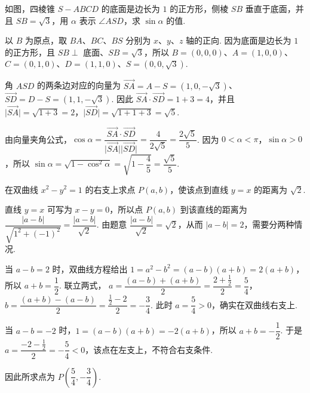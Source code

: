 \begin{problem}
如图，四棱锥 \(S - ABCD\) 的底面是边长为 \(1\) 的正方形，侧棱 \(SB\) 垂直于底面，并且 \(SB = \sqrt{3}\)，用 \(\alpha\) 表示 \(\angle ASD\)，求 \(\sin\alpha\) 的值.

\end{problem}

\begin{solution}
以 \(B\) 为原点，取 \(BA\)、\(BC\)、\(BS\) 分别为 \(x\)、\(y\)、\(z\) 轴的正向. 因为底面是边长为 \(1\) 的正方形，且 \(SB\perp\) 底面、\(SB=\sqrt3\)，所以
\(B=(0,0,0)\)、\(A=(1,0,0)\)、\(C=(0,1,0)\)、\(D=(1,1,0)\)、\(S=(0,0,\sqrt3)\).

角 \(ASD\) 的两条边对应的向量为 \(\overrightarrow{SA}=A-S=(1,0,-\sqrt3)\)、\(\overrightarrow{SD}=D-S=(1,1,-\sqrt3)\). 因此
\(\overrightarrow{SA}\cdot\overrightarrow{SD}=1+3=4\)，并且 \(\lvert\overrightarrow{SA}\rvert=\sqrt{1+3}=2\)，\(\lvert\overrightarrow{SD}\rvert=\sqrt{1+1+3}=\sqrt5\).

由向量夹角公式，\(\cos\alpha=\dfrac{\overrightarrow{SA}\cdot\overrightarrow{SD}}{\lvert\overrightarrow{SA}\rvert\lvert\overrightarrow{SD}\rvert}=\dfrac4{2\sqrt5}=\dfrac{2\sqrt5}{5}\). 因为 \(0<\alpha<\pi\)，\(\sin\alpha>0\)，所以
\(\sin\alpha=\sqrt{1-\cos^2\alpha}=\sqrt{1-\dfrac45}=\dfrac{\sqrt5}{5}\).
\end{solution}

\begin{problem}
在双曲线 \(x^2 - y^2 = 1\) 的右支上求点 \(P(a,b)\)，使该点到直线 \(y = x\) 的距离为 \(\sqrt{2}\).
\end{problem}

\begin{solution}
直线 \(y=x\) 可写为 \(x-y=0\)，所以点 \(P(a,b)\) 到该直线的距离为 \(\dfrac{\lvert a-b\rvert}{\sqrt{1^2+(-1)^2}}=\dfrac{\lvert a-b\rvert}{\sqrt2}\). 由题意 \(\dfrac{\lvert a-b\rvert}{\sqrt2}=\sqrt2\)，从而 \(\lvert a-b\rvert=2\)，需要分两种情况.

当 \(a-b=2\) 时，双曲线方程给出 \(1=a^2-b^2=(a-b)(a+b)=2(a+b)\)，所以 \(a+b=\dfrac12\). 联立两式，
\(a=\dfrac{(a-b)+(a+b)}2=\dfrac{2+\frac12}{2}=\dfrac54\)，\(b=\dfrac{(a+b)-(a-b)}2=\dfrac{\frac12-2}{2}=-\dfrac34\). 此时 \(a=\dfrac54>0\)，确实在双曲线右支上.

当 \(a-b=-2\) 时，\(1=(a-b)(a+b)=-2(a+b)\)，所以 \(a+b=-\dfrac12\). 于是 \(a=\dfrac{-2-\frac12}{2}=-\dfrac54<0\)，该点在左支上，不符合右支条件.

因此所求点为 \(P\left(\dfrac54,-\dfrac34\right)\).
\end{solution}

